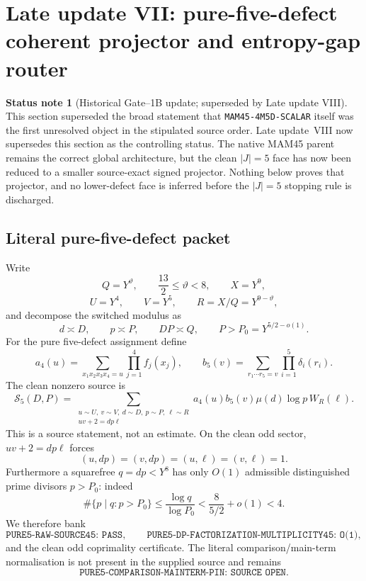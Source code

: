 \documentclass[11pt]{article}
\theoremstyle{definition}
\newtheorem{status}[status]{Status note}
\newcommand{\1}{\mathbf 1}
\begin{document}
\section{Late update VII: pure-five-defect coherent projector and entropy-gap router}
\label{app:pure5-dp}

\begin{status}[Historical Gate--1B update; superseded by Late update VIII]
This section superseded the broad statement that
\texttt{MAM45-4M5D-SCALAR} itself was the first unresolved object in the
stipulated source order.  Late update~VIII now supersedes this section as the
controlling status.  The native MAM45 parent remains the correct global
architecture, but the clean $|J|=5$ face has now been reduced to a smaller
source-exact signed projector.  Nothing below proves that projector, and no
lower-defect face is inferred before the $|J|=5$ stopping rule is discharged.
\end{status}

\subsection{Literal pure-five-defect packet}
Write
\[
 Q=Y^\vartheta,\qquad \frac{13}{2}\le\vartheta<8,\qquad X=Y^9,
\]
\[
 U=Y^4,\qquad V=Y^5,\qquad R=X/Q=Y^{9-\vartheta},
\]
and decompose the switched modulus as
\[
 d\asymp D,\qquad p\asymp P,\qquad DP\asymp Q,
 \qquad P>P_0=Y^{5/2-o(1)}.
\]
For the pure five-defect assignment define
\[
 a_4(u)=\sum_{x_1x_2x_3x_4=u}\prod_{j=1}^4 f_j(x_j),
 \qquad
 b_5(v)=\sum_{r_1\cdots r_5=v}\prod_{i=1}^5\delta_i(r_i).
\]
The clean nonzero source is
\begin{equation}
 \boxed{
 \mathcal S_5(D,P)=
 \sum_{\substack{u\sim U,\ v\sim V,\ d\sim D,\ p\sim P,\ \ell\sim R\\
                   uv+2=dp\ell}}
 a_4(u)b_5(v)\mu(d)\log p\,W_R(\ell).
 }
 \label{eq:d15-pure5-source}
\end{equation}
This is a source statement, not an estimate.  On the clean odd sector,
$uv+2=dp\ell$ forces
\[
 (u,dp)=(v,dp)=(u,\ell)=(v,\ell)=1.
\]
Furthermore a squarefree $q=dp<Y^8$ has only $O(1)$ admissible distinguished
prime divisors $p>P_0$: indeed
\[
 \#\{p\mid q:p>P_0\}
 \le \frac{\log q}{\log P_0}<\frac{8}{5/2}+o(1)<4.
\]
We therefore bank
\[
 \boxed{\texttt{PURE5-RAW-SOURCE45: PASS}},\qquad
 \boxed{\texttt{PURE5-DP-FACTORIZATION-MULTIPLICITY45: O(1)}},
\]
and the clean odd coprimality certificate.  The literal comparison/main-term
normalisation is not present in the supplied source and remains
\[
 \boxed{\texttt{PURE5-COMPARISON-MAINTERM-PIN: SOURCE OPEN}}.
\]
\end{document}
